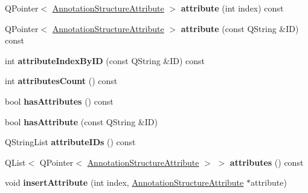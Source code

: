 \begin{DoxyCompactItemize}
\item 
\mbox{\label{class_annotation_structure_level_aaa843ffde9f31c28052263fb6ef4f9e0}} 
Q\+Pointer$<$ \hyperlink{class_annotation_structure_attribute}{Annotation\+Structure\+Attribute} $>$ {\bfseries attribute} (int index) const
\item 
\mbox{\label{class_annotation_structure_level_a096ca66fca9d2226bbbb7558518587d1}} 
Q\+Pointer$<$ \hyperlink{class_annotation_structure_attribute}{Annotation\+Structure\+Attribute} $>$ {\bfseries attribute} (const Q\+String \&ID) const
\item 
\mbox{\label{class_annotation_structure_level_af679873831d05ade95e7d7587b5e1dcc}} 
int {\bfseries attribute\+Index\+By\+ID} (const Q\+String \&ID) const
\item 
\mbox{\label{class_annotation_structure_level_a726491c28b63f3140c9c1e2f6e6c0c2a}} 
int {\bfseries attributes\+Count} () const
\item 
\mbox{\label{class_annotation_structure_level_af1b1599c8048b257293c34c8390658d5}} 
bool {\bfseries has\+Attributes} () const
\item 
\mbox{\label{class_annotation_structure_level_a041f830775922af4ea907d070a039080}} 
bool {\bfseries has\+Attribute} (const Q\+String \&ID)
\item 
\mbox{\label{class_annotation_structure_level_ada820074c9207c1601100c92f5d9796b}} 
Q\+String\+List {\bfseries attribute\+I\+Ds} () const
\item 
\mbox{\label{class_annotation_structure_level_af893384c9a873ce8816505364358dfb4}} 
Q\+List$<$ Q\+Pointer$<$ \hyperlink{class_annotation_structure_attribute}{Annotation\+Structure\+Attribute} $>$ $>$ {\bfseries attributes} () const
\item 
\mbox{\label{class_annotation_structure_level_aa77cfa1015672e248eed37ea75db7e47}} 
void {\bfseries insert\+Attribute} (int index, \hyperlink{class_annotation_structure_attribute}{Annotation\+Structure\+Attribute} $\ast$attribute)

\end{DoxyCompactItemize}
